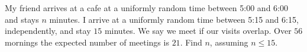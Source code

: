 My friend arrives at a cafe at a uniformly random time between 5:00 and 6:00 and stays $n$ minutes. I arrive at a uniformly random time between 5:15 and 6:15, independently, and stay $15$ minutes. We say we meet if our visits overlap. Over $56$ mornings the expected number of meetings is $21$. Find $n$, assuming $n\le15$.
